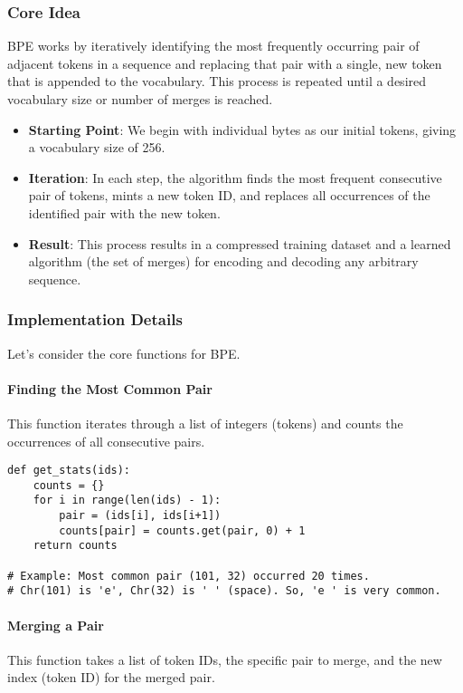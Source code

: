 \subsubsection{Core Idea}
BPE works by iteratively identifying the most frequently occurring pair of adjacent tokens in a sequence and replacing that pair with a single, new token that is appended to the vocabulary. This process is repeated until a desired vocabulary size or number of merges is reached.

\begin{itemize}
    \item \textbf{Starting Point}: We begin with individual bytes as our initial tokens, giving a vocabulary size of 256.
    \item \textbf{Iteration}: In each step, the algorithm finds the most frequent consecutive pair of tokens, mints a new token ID, and replaces all occurrences of the identified pair with the new token.
    \item \textbf{Result}: This process results in a compressed training dataset and a learned algorithm (the set of merges) for encoding and decoding any arbitrary sequence.
\end{itemize}

\subsubsection{Implementation Details}
Let's consider the core functions for BPE.

\paragraph{Finding the Most Common Pair}
This function iterates through a list of integers (tokens) and counts the occurrences of all consecutive pairs.

\begin{lstlisting}[caption={Function to get pair statistics}]
def get_stats(ids):
    counts = {}
    for i in range(len(ids) - 1):
        pair = (ids[i], ids[i+1])
        counts[pair] = counts.get(pair, 0) + 1
    return counts

# Example: Most common pair (101, 32) occurred 20 times.
# Chr(101) is 'e', Chr(32) is ' ' (space). So, 'e ' is very common.
\end{lstlisting}

\paragraph{Merging a Pair}
This function takes a list of token IDs, the specific pair to merge, and the new index (token ID) for the merged pair.

